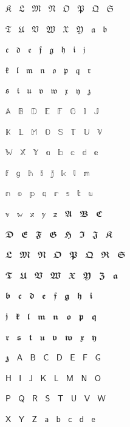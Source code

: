 \documentclass{article}
\begin{document}
$\mfrakK$ $\mfrakL$ $\mfrakM$ $\mfrakN$ $\mfrakO$ $\mfrakP$ $\mfrakQ$ $\mfrakS$ \par
$\mfrakT$ $\mfrakU$ $\mfrakV$ $\mfrakW$ $\mfrakX$ $\mfrakY$ $\mfraka$ $\mfrakb$ \par
$\mfrakc$ $\mfrakd$ $\mfrake$ $\mfrakf$ $\mfrakg$ $\mfrakh$ $\mfraki$ $\mfrakj$ \par
$\mfrakk$ $\mfrakl$ $\mfrakm$ $\mfrakn$ $\mfrako$ $\mfrakp$ $\mfrakq$ $\mfrakr$ \par
$\mfraks$ $\mfrakt$ $\mfraku$ $\mfrakv$ $\mfrakw$ $\mfrakx$ $\mfraky$ $\mfrakz$ \par
$\BbbA$ $\BbbB$ $\BbbD$ $\BbbE$ $\BbbF$ $\BbbG$ $\BbbI$ $\BbbJ$ \par
$\BbbK$ $\BbbL$ $\BbbM$ $\BbbO$ $\BbbS$ $\BbbT$ $\BbbU$ $\BbbV$ \par
$\BbbW$ $\BbbX$ $\BbbY$ $\Bbba$ $\Bbbb$ $\Bbbc$ $\Bbbd$ $\Bbbe$ \par
$\Bbbf$ $\Bbbg$ $\Bbbh$ $\Bbbi$ $\Bbbj$ $\Bbbk$ $\Bbbl$ $\Bbbm$ \par
$\Bbbn$ $\Bbbo$ $\Bbbp$ $\Bbbq$ $\Bbbr$ $\Bbbs$ $\Bbbt$ $\Bbbu$ \par
$\Bbbv$ $\Bbbw$ $\Bbbx$ $\Bbby$ $\Bbbz$ $\mbffrakA$ $\mbffrakB$ $\mbffrakC$ \par
$\mbffrakD$ $\mbffrakE$ $\mbffrakF$ $\mbffrakG$ $\mbffrakH$ $\mbffrakI$ $\mbffrakJ$ $\mbffrakK$ \par
$\mbffrakL$ $\mbffrakM$ $\mbffrakN$ $\mbffrakO$ $\mbffrakP$ $\mbffrakQ$ $\mbffrakR$ $\mbffrakS$ \par
$\mbffrakT$ $\mbffrakU$ $\mbffrakV$ $\mbffrakW$ $\mbffrakX$ $\mbffrakY$ $\mbffrakZ$ $\mbffraka$ \par
$\mbffrakb$ $\mbffrakc$ $\mbffrakd$ $\mbffrake$ $\mbffrakf$ $\mbffrakg$ $\mbffrakh$ $\mbffraki$ \par
$\mbffrakj$ $\mbffrakk$ $\mbffrakl$ $\mbffrakm$ $\mbffrakn$ $\mbffrako$ $\mbffrakp$ $\mbffrakq$ \par
$\mbffrakr$ $\mbffraks$ $\mbffrakt$ $\mbffraku$ $\mbffrakv$ $\mbffrakw$ $\mbffrakx$ $\mbffraky$ \par
$\mbffrakz$ $\msansA$ $\msansB$ $\msansC$ $\msansD$ $\msansE$ $\msansF$ $\msansG$ \par
$\msansH$ $\msansI$ $\msansJ$ $\msansK$ $\msansL$ $\msansM$ $\msansN$ $\msansO$ \par
$\msansP$ $\msansQ$ $\msansR$ $\msansS$ $\msansT$ $\msansU$ $\msansV$ $\msansW$ \par
$\msansX$ $\msansY$ $\msansZ$ $\msansa$ $\msansb$ $\msansc$ $\msansd$ $\msanse$ \par
\end{document}
